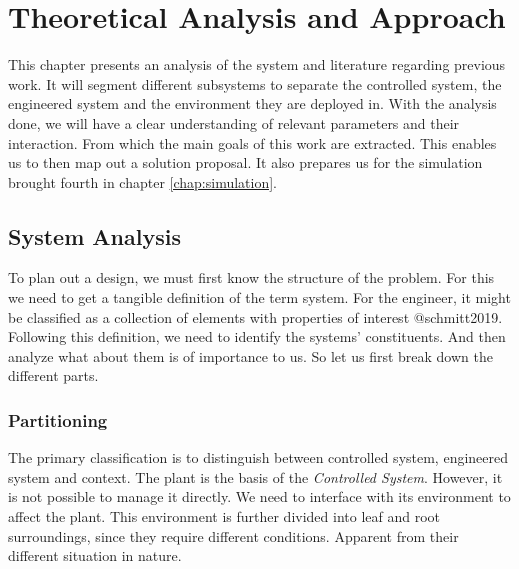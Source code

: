 \chapter{Theoretical Analysis and Approach}
\label{chap:analysis-and-arch}
This chapter presents an analysis of the system and literature regarding previous work.
It will segment different subsystems to separate the controlled system, the engineered system and the environment they are deployed in.
With the analysis done, we will have a clear understanding of relevant parameters and their interaction.
From which the main goals of this work are extracted.
This enables us to then map out a solution proposal.
It also prepares us for the simulation brought fourth in chapter \ref{chap:simulation}.



%
\section{System Analysis}
\label{sec:system-analysis}
To plan out a design, we must first know the structure of the problem. %
For this we need to get a tangible definition of the term system.
For the engineer, it might be classified as a collection of elements with properties of interest @schmitt2019.
Following this definition, we need to identify the systems' constituents.
And then analyze what about them is of importance to us.
So let us first break down the different parts.

\subsection{Partitioning}
\label{sub:partitioning}
The primary classification is to distinguish between controlled system, engineered system and context.
The plant is the basis of the \textit{Controlled System}.
However, it is not possible to manage it directly.
We need to interface with its environment to affect the plant.
This environment is further divided into leaf and root surroundings, since they require different conditions.
Apparent from their different situation in nature.

